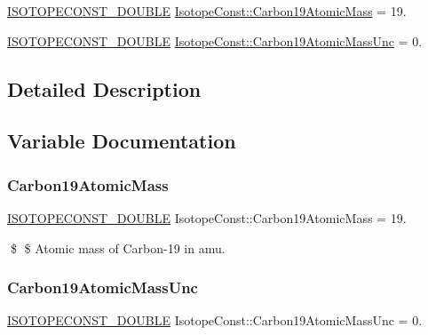 \begin{DoxyCompactItemize}
\item 
\mbox{\hyperlink{group___isotope_const-_macros_ga8f45a7272ce02c0b4c65c44636ed719a}{I\+S\+O\+T\+O\+P\+E\+C\+O\+N\+S\+T\+\_\+\+D\+O\+U\+B\+LE}} \mbox{\hyperlink{group___isotope_const-_carbon-_c19_ga6f609576d6529406c26c9ad31273678b}{Isotope\+Const\+::\+Carbon19\+Atomic\+Mass}} = 19.
\item 
\mbox{\hyperlink{group___isotope_const-_macros_ga8f45a7272ce02c0b4c65c44636ed719a}{I\+S\+O\+T\+O\+P\+E\+C\+O\+N\+S\+T\+\_\+\+D\+O\+U\+B\+LE}} \mbox{\hyperlink{group___isotope_const-_carbon-_c19_ga41ba8a6b1097d8ef79a417549b5ec8a6}{Isotope\+Const\+::\+Carbon19\+Atomic\+Mass\+Unc}} = 0.
\end{DoxyCompactItemize}


\subsection{Detailed Description}


\subsection{Variable Documentation}
\mbox{\label{group___isotope_const-_carbon-_c19_ga6f609576d6529406c26c9ad31273678b}} 
\subsubsection{\texorpdfstring{Carbon19\+Atomic\+Mass}{Carbon19AtomicMass}}
{\footnotesize\ttfamily \mbox{\hyperlink{group___isotope_const-_macros_ga8f45a7272ce02c0b4c65c44636ed719a}{I\+S\+O\+T\+O\+P\+E\+C\+O\+N\+S\+T\+\_\+\+D\+O\+U\+B\+LE}} Isotope\+Const\+::\+Carbon19\+Atomic\+Mass = 19.}

\$ \$ Atomic mass of Carbon-\/19 in amu. \mbox{\label{group___isotope_const-_carbon-_c19_ga41ba8a6b1097d8ef79a417549b5ec8a6}} 
\subsubsection{\texorpdfstring{Carbon19\+Atomic\+Mass\+Unc}{Carbon19AtomicMassUnc}}
{\footnotesize\ttfamily \mbox{\hyperlink{group___isotope_const-_macros_ga8f45a7272ce02c0b4c65c44636ed719a}{I\+S\+O\+T\+O\+P\+E\+C\+O\+N\+S\+T\+\_\+\+D\+O\+U\+B\+LE}} Isotope\+Const\+::\+Carbon19\+Atomic\+Mass\+Unc = 0.}

